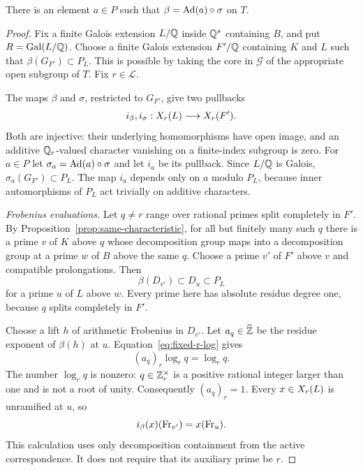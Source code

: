 \begin{proposition}\label{prop:identify-normalized}
There is an element $a\in P$ such that $\beta=\operatorname{Ad}(a)\circ\sigma$ on $T$.
\end{proposition}
\begin{proof}
Fix a finite Galois extension $L/\mathbb Q$ inside $\mathbb Q^s$ containing $B$, and put $R=\operatorname{Gal}(L/\mathbb Q)$. Choose a finite Galois extension $F'/\mathbb Q$ containing $K$ and $L$ such that $\beta(G_{F'})\subset P_L$. This is possible by taking the core in $\mathcal G$ of the appropriate open subgroup of $T$. Fix $r\in\mathcal L$.

The maps $\beta$ and $\sigma$, restricted to $G_{F'}$, give two pullbacks
\begin{equation}\label{eq:two-pullbacks}
 i_\beta,i_\sigma:X_{r}(L)\longrightarrow X_{r}(F').
\end{equation}
Both are injective: their underlying homomorphisms have open image, and an additive $\mathbb Q_r$-valued character vanishing on a finite-index subgroup is zero. For $a\in P$ let $\sigma_a=\operatorname{Ad}(a)\circ\sigma$ and let $i_a$ be its pullback. Since $L/\mathbb Q$ is Galois, $\sigma_a(G_{F'})\subset P_L$. The map $i_a$ depends only on $a$ modulo $P_L$, because inner automorphisms of $P_L$ act trivially on additive characters.

\emph{Frobenius evaluations.}
Let $q\ne r$ range over rational primes split completely in $F'$. By Proposition~\ref{prop:same-characteristic}, for all but finitely many such $q$ there is a prime $v$ of $K$ above $q$ whose decomposition group maps into a decomposition group at a prime $w$ of $B$ above the same $q$. Choose a prime $v'$ of $F'$ above $v$ and compatible prolongations. Then
\[
 \beta(D_{v'})\subset D_u\subset P_L
\]
for a prime $u$ of $L$ above $w$. Every prime here has absolute residue degree one, because $q$ splits completely in $F'$.

Choose a lift $h$ of arithmetic Frobenius in $D_{v'}$. Let $a_q\in\widehat{\mathbb Z}$ be the residue exponent of $\beta(h)$ at $u$. Equation~\eqref{eq:fixed-r-log} gives
\[
 (a_q)_r\log_r q=\log_r q.
\]
The number $\log_r q$ is nonzero: $q\in\mathbb Z_r^\times$ is a positive rational integer larger than one and is not a root of unity. Consequently $(a_q)_r=1$. Every $x\in X_{r}(L)$ is unramified at $u$, so
\begin{equation}\label{eq:matched-evaluation}
 i_\beta(x)(\operatorname{Fr}_{v'})=x(\operatorname{Fr}_u).
\end{equation}
This calculation uses only decomposition containment from the active correspondence. It does not require that its auxiliary prime be $r$.


\end{proof}
